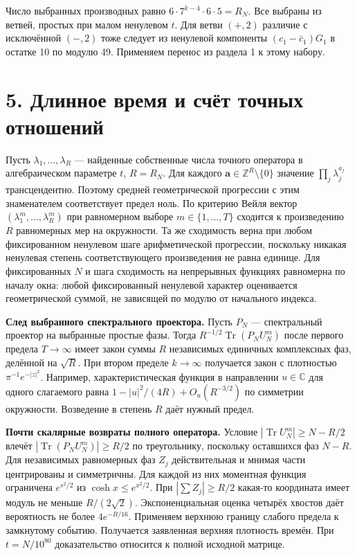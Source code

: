 \documentclass[11pt,a4paper]{article}
\newcommand{\Tr}{\operatorname{Tr}}
\newcommand{\Z}{\mathbb Z}
\newcommand{\C}{\mathbb C}
\newcommand{\sect}[1]{\section*{\sffamily\color{ink}#1}}
\newcommand{\subt}[1]{\par\medskip\noindent\textbf{#1.}\quad}
\begin{document}
Число выбранных производных равно \(6\cdot7^{k-4}\cdot6\cdot5=R_N\). Все выбраны из ветвей, простых при малом ненулевом \(t\). Для ветви \((+,2)\) различие с исключённой \((-,2)\) тоже следует из ненулевой компоненты \((c_1-\bar c_1)G_1\) в остатке 10 по модулю 49. Применяем перенос из раздела 1 к этому набору.

\newpage
\sect{5. Длинное время и счёт точных отношений}
Пусть \(\lambda_1,\ldots,\lambda_R\) --- найденные собственные числа точного оператора в алгебраическом параметре \(t\), \(R=R_N\). Для каждого \(\mathbf a\in\Z^R\setminus\{0\}\) значение \(\prod_j\lambda_j^{a_j}\) трансцендентно. Поэтому средней геометрической прогрессии с этим знаменателем соответствует предел ноль. По критерию Вейля вектор \((\lambda_1^m,\ldots,\lambda_R^m)\) при равномерном выборе \(m\in\{1,\ldots,T\}\) сходится к произведению \(R\) равномерных мер на окружности. Та же сходимость верна при любом фиксированном ненулевом шаге арифметической прогрессии, поскольку никакая ненулевая степень соответствующего произведения не равна единице. Для фиксированных \(N\) и шага сходимость на непрерывных функциях равномерна по началу окна: любой фиксированный ненулевой характер оценивается геометрической суммой, не зависящей по модулю от начального индекса.

\subt{След выбранного спектрального проектора}
Пусть \(P_N\) --- спектральный проектор на выбранные простые фазы. Тогда \(R^{-1/2}\Tr(P_NU_N^m)\) после первого предела \(T\to\infty\) имеет закон суммы \(R\) независимых единичных комплексных фаз, делённой на \(\sqrt R\). При втором пределе \(k\to\infty\) получается закон с плотностью \(\pi^{-1}e^{-|z|^2}\). Например, характеристическая функция в направлении \(u\in\C\) для одного слагаемого равна \(1-|u|^2/(4R)+O_u(R^{-3/2})\) по симметрии окружности. Возведение в степень \(R\) даёт нужный предел.

\subt{Почти скалярные возвраты полного оператора}
Условие \(|\Tr U_N^m|\ge N-R/2\) влечёт \(|\Tr(P_NU_N^m)|\ge R/2\) по треугольнику, поскольку оставшихся фаз \(N-R\). Для независимых равномерных фаз \(Z_j\) действительная и мнимая части центрированы и симметричны. Для каждой из них моментная функция ограничена \(e^{s^2/2}\) из \(\cosh x\le e^{x^2/2}\). При \(|\sum Z_j|\ge R/2\) какая-то координата имеет модуль не меньше \(R/(2\sqrt2)\). Экспоненциальная оценка четырёх хвостов даёт вероятность не более \(4e^{-R/16}\). Применяем верхнюю границу слабого предела к замкнутому событию. Получается заявленная верхняя плотность времён. При \(t=N/10^{80}\) доказательство относится к полной исходной матрице.
\end{document}
